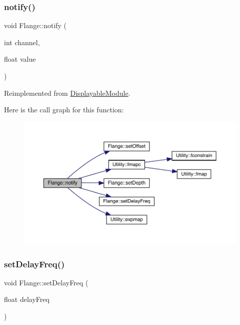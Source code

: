\subsubsection{\texorpdfstring{notify()}{notify()}}
{\footnotesize\ttfamily void Flange\+::notify (\begin{DoxyParamCaption}\item[{int}]{channel,  }\item[{float}]{value }\end{DoxyParamCaption})\hspace{0.3cm}{\ttfamily [virtual]}}



Reimplemented from \mbox{\hyperlink{class_displayable_module_a8ae5383931f10c54cff2feef2bc07dee}{Displayable\+Module}}.

Here is the call graph for this function\+:\nopagebreak
\begin{figure}[H]
\begin{center}
\leavevmode
\includegraphics[width=350pt]{class_flange_a10541758c108d92a73e96ed9f8f1377b_cgraph}
\end{center}
\end{figure}
\mbox{\label{class_flange_af132f265ce1567691ffa2ce29bb512c6}} 
\subsubsection{\texorpdfstring{set\+Delay\+Freq()}{setDelayFreq()}}
{\footnotesize\ttfamily void Flange\+::set\+Delay\+Freq (\begin{DoxyParamCaption}\item[{float}]{delay\+Freq }\end{DoxyParamCaption})}

